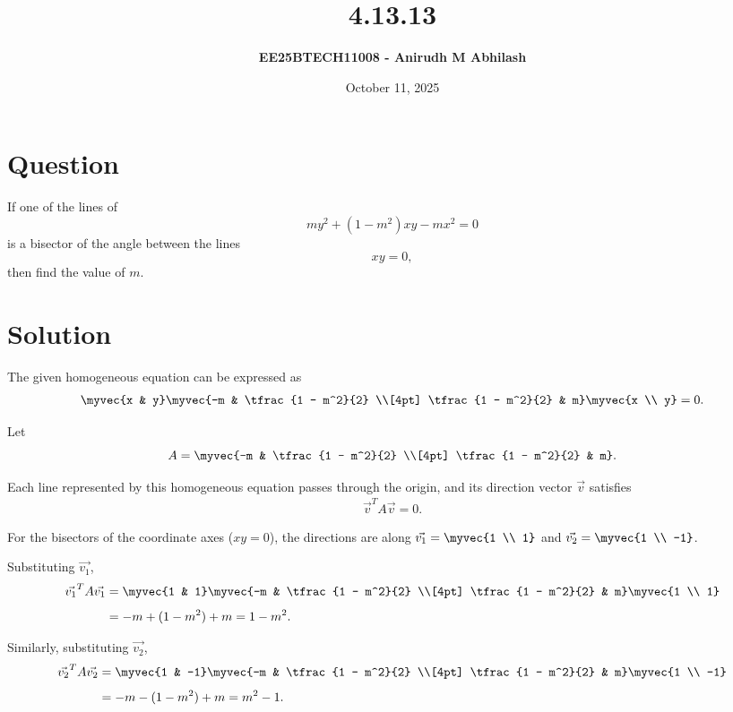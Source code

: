 \documentclass[12pt]{article}
\title{\textbf{4.13.13}}
\author{\textbf{EE25BTECH11008 - Anirudh M Abhilash}}
\date{October 11, 2025}
\begin{document}
\maketitle

\section*{Question}

If one of the lines of 
\[
m y^2 + (1 - m^2)xy - m x^2 = 0
\]
is a bisector of the angle between the lines 
\[
xy = 0,
\]
then find the value of $m$.

\section*{Solution}

The given homogeneous equation can be expressed as
\begin{align}
\myvec{x & y}
\myvec{-m & \tfrac{1 - m^2}{2} \\[4pt] \tfrac{1 - m^2}{2} & m}
\myvec{x \\ y} = 0.
\end{align}

Let 
\[
A = \myvec{-m & \tfrac{1 - m^2}{2} \\[4pt] \tfrac{1 - m^2}{2} & m}.
\]

Each line represented by this homogeneous equation passes through the origin, and its direction vector $\vec{v}$ satisfies
\begin{align}
\vec{v}^T A \vec{v} = 0.
\end{align}

For the bisectors of the coordinate axes ($xy=0$), the directions are along $\vec{v_1} = \myvec{1 \\ 1}$ and $\vec{v_2} = \myvec{1 \\ -1}$.

Substituting $\vec{v_1}$,
\begin{align}
\vec{v_1}^T A \vec{v_1} &= \myvec{1 & 1}
\myvec{-m & \tfrac{1 - m^2}{2} \\[4pt] \tfrac{1 - m^2}{2} & m}
\myvec{1 \\ 1} \\[4pt]
&= -m + (1 - m^2) + m = 1 - m^2.
\end{align}

Similarly, substituting $\vec{v_2}$,
\begin{align}
\vec{v_2}^T A \vec{v_2} &= \myvec{1 & -1}
\myvec{-m & \tfrac{1 - m^2}{2} \\[4pt] \tfrac{1 - m^2}{2} & m}
\myvec{1 \\ -1} \\[4pt]
&= -m - (1 - m^2) + m = m^2 - 1.
\end{align}
\end{document}
